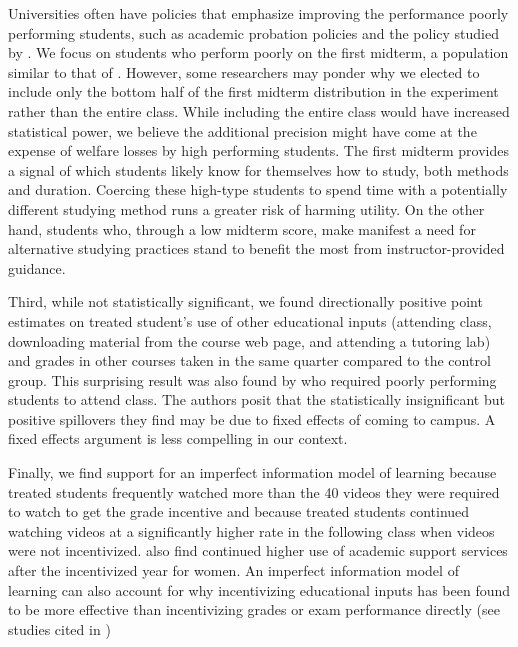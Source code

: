 \documentclass[12pt]{article}
\begin{document}
Universities often have policies that emphasize improving the performance poorly performing students, such as academic probation policies and the policy studied by \textcite{kow2020}. We focus on students who perform poorly on the first midterm, a population similar to that of \textcite{dgm2010}. However, some researchers may ponder why we elected to include only the bottom half of the first midterm distribution in the experiment rather than the entire class. While including the entire class would have increased statistical power, we believe the additional precision might have come at the expense of welfare losses by high performing students. The first midterm provides a signal of which students likely know for themselves how to study, both methods and duration. Coercing these high-type students to spend time with a potentially different studying method runs a greater risk of harming utility. On the other hand, students who, through a low midterm score, make manifest a need for alternative studying practices stand to benefit the most from instructor-provided guidance.

Third, while not statistically significant, we found directionally positive point estimates on treated student's use of other educational inputs (attending class, downloading material from the course web page, and attending a tutoring lab) and grades in other courses taken in the same quarter compared to the control group. This surprising result was also found by \textcite{dgm2010} who required poorly performing students to attend class. The authors posit that the statistically insignificant but positive spillovers they find may be due to fixed effects of coming to campus. A fixed effects argument is less compelling in our context.

Finally, we find support for an imperfect information model of learning because treated students frequently watched more than the 40 videos they were required to watch to get the grade incentive and because treated students continued watching videos at a significantly higher rate in the following class when videos were not incentivized. \textcite{alo2009} also find continued higher use of academic support services after the incentivized year for women. An imperfect information model of learning can also account for why incentivizing educational inputs has been found to be more effective than incentivizing grades or exam performance directly (see studies cited in \textcite{gmr2011})
\end{document}
